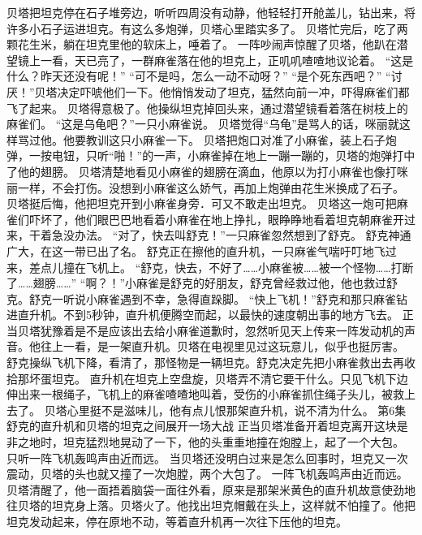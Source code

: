 \documentclass[a4paper,12pt,UTF8,twoside]{ctexbook}
\begin{document}
        贝塔把坦克停在石子堆旁边，听听四周没有动静，他轻轻打开舱盖儿，钻出来，将许多小石子运进坦克。有这么多炮弹，贝塔心里踏实多了。 
        贝塔忙完后，吃了两颗花生米，躺在坦克里他的软床上，唾着了。 
        一阵吵闹声惊醒了贝塔，他趴在潜望镜上一看，天已亮了，一群麻雀落在他的坦克上，正叽叽喳喳地议论着。 
        “这是什么？昨天还没有呢！” 
        “可不是吗，怎么一动不动呀？” 
        “是个死东西吧？” 
        “讨厌！”贝塔决定吓唬他们一下。他悄悄发动了坦克，猛然向前一冲，吓得麻雀们都飞了起来。 
        贝塔得意极了。他操纵坦克掉回头来，通过潜望镜看着落在树枝上的麻雀们。 
        “这是乌龟吧？”一只小麻雀说。 
        贝塔觉得“乌龟”是骂人的话，咪丽就这样骂过他。他要教训这只小麻雀一下。 
        贝塔把炮口对准了小麻雀，装上石子炮弹，一按电钮，只听“啪！”的一声，小麻雀掉在地上一蹦一蹦的，贝塔的炮弹打中了他的翅膀。 
        贝塔清楚地看见小麻雀的翅膀在滴血，他原以为打小麻雀也像打咪丽一样，不会打伤。没想到小麻雀这么娇气，再加上炮弹由花生米换成了石子。 
        贝塔挺后悔，他把坦克开到小麻雀身旁．可又不敢走出坦克。 
        贝塔这一炮可把麻雀们吓坏了，他们眼巴巴地看着小麻雀在地上挣扎，眼睁睁地看着坦克朝麻雀开过来，干着急没办法。 
        “对了，快去叫舒克！”一只麻雀忽然想到了舒克。 
        舒克神通广大，在这一带已出了名。 
        舒克正在擦他的直升机，一只麻雀气喘吁叮地飞过来，差点儿撞在飞机上。 
        “舒克，快去，不好了……小麻雀被……被一个怪物……打断了……翅膀……” 
        “啊？！”小麻雀是舒克的好朋友，舒克曾经救过他，他也救过舒克。舒克一听说小麻雀遇到不幸，急得直跺脚。 
        “快上飞机！”舒克和那只麻雀钻进直升机。不到5秒钟，直升机便腾空而起，以最快的速度朝出事的地方飞去。 
        正当贝塔犹豫着是不是应该出去给小麻雀道歉时，忽然听见天上传来一阵发动机的声音。他往上一看，是一架直升机。贝塔在电视里见过这玩意儿，似乎也挺厉害。 
        舒克操纵飞机下降，看清了，那怪物是一辆坦克。舒克决定先把小麻雀救出去再收拾那坏蛋坦克。 
        直升机在坦克上空盘旋，贝塔弄不清它要干什么。只见飞机下边伸出来一根绳子，飞机上的麻雀喳喳地叫着，受伤的小麻雀抓住绳子头儿，被救上去了。 
        贝塔心里挺不是滋味儿，他有点儿恨那架直升机，说不清为什么。   第6集 
        舒克的直升机和贝塔的坦克之间展开一场大战   
        正当贝塔准备开着坦克离开这块是非之地时，坦克猛烈地晃动了一下，他的头重重地撞在炮膛上，起了一个大包。 
        只听一阵飞机轰鸣声由近而远。 
        当贝塔还没明白过来是怎么回事时，坦克又一次震动，贝塔的头也就又撞了一次炮膛，两个大包了。 
        一阵飞机轰鸣声由近而远。 
        贝塔清醒了，他一面捂着脑袋一面往外看，原来是那架米黄色的直升机故意使劲地往贝塔的坦克身上落。贝塔火了。他找出坦克帽戴在头上，这样就不怕撞了。他把坦克发动起来，停在原地不动，等着直升机再一次往下压他的坦克。 
\end{document}
